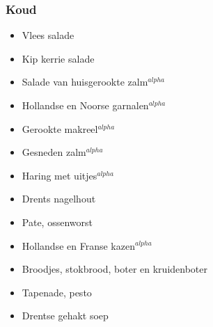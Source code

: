 \subsubsection*{Koud}
\begin{itemize}
	\item	Vlees salade
	\item	Kip kerrie salade
	\item	Salade van huisgerookte zalm$^{alpha}$
	\item	Hollandse en Noorse garnalen$^{alpha}$
	\item	Gerookte makreel$^{alpha}$
	\item	Gesneden zalm$^{alpha}$
	\item	Haring met uitjes$^{alpha}$
	\item	Drents nagelhout
	\item	Pate, ossenworst
	\item	Hollandse en Franse kazen$^{alpha}$
	\item	Broodjes, stokbrood, boter en kruidenboter
	\item	Tapenade, pesto
	\item	Drentse gehakt soep
\end{itemize}
